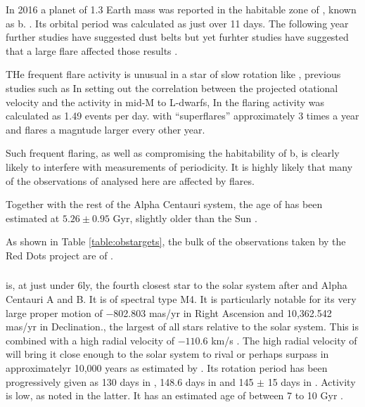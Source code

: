 In 2016 a planet of 1.3 Earth mass was reported in the habitable
zone of \prox, known as {\prox} b. \citep{angladaescude16}. Its orbital period was calculated as just over 11
days. The following year further studies have suggested dust belts \citep{anglada17} but yet furhter
studies have suggested that a large flare affected those results \citep{macgregor18}.

THe frequent flare activity is unusual in a star of slow rotation like \prox,
previous studies such as In \citet{mohanty03} setting out the correlation
between the projected otational velocity {\vsini} and the
activity in mid-M to L-dwarfs, In \citet{vida19} the flaring activity was
calculated as 1.49 events per day. with ``superflares'' approximately 3 times a
year and flares a magntude larger every other year.

Such frequent flaring, as well as compromising the habitability of {\prox} b,
is clearly likely to interfere with measurements of periodicity. It is highly
likely that many of the observations of {\prox} analysed here are affected by
flares.

Together with the rest of the Alpha Centauri system, the age of {\prox} has been
estimated at $5.26 \pm 0.95$ Gyr, slightly older than the Sun \citep{joyce18}.

As shown in Table \ref{table:obstargets}, the bulk of the observations taken
by the Red Dots project are of \prox.

\subsubsection{\bstar}
{\bstar} is, at just under 6ly, the fourth closest star to the solar system after {\prox} and Alpha Centauri A and B. It is of spectral type M4.
It is particularly notable for its very large proper motion of −802.803 mas/yr in Right Ascension and 10,362.542 mas/yr in Declination., the largest of all
stars relative to the solar system. This is combined with a high radial velocity of $-110.6$ km/s \citep{bobylev17}.
The high radial velocity of {\bstar} will bring it close enough
to the solar system to rival or perhaps surpass {\prox} in approximatelyr 10,000 years as estimated by \citet{bobylev10}.
Its rotation period has been progressively given as 130 days in
\citet{benedict98}, 148.6 days in \citet{suarezmascareno15} and 145 $\pm$ 15 days in \citet{toledopadron18}. Activity is low, as noted in the latter.
It has an estimated age of between 7 to 10 Gyr \citep{ribas18}.

